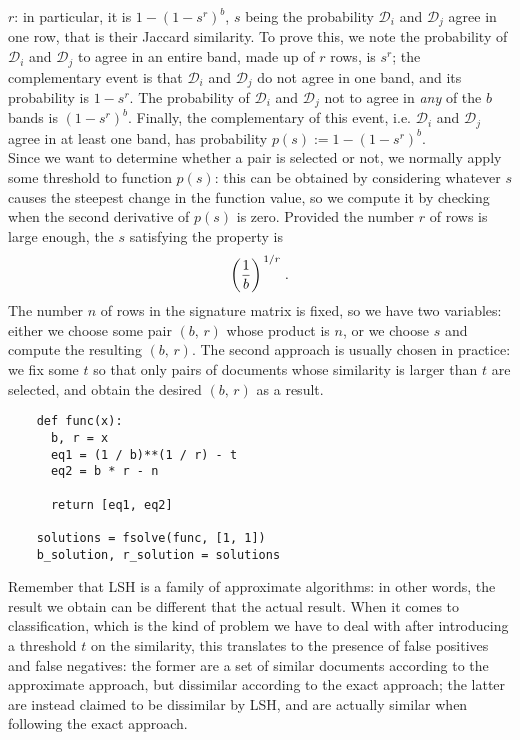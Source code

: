 \documentclass{article}
\begin{document}
  \( r \): in particular, it is \( 1 - ( 1 - s^r )^b \), \( s \) being the
  probability \( \mathcal D_i \) and \( \mathcal D_j \) agree in one row, that
  is their Jaccard similarity. To prove this, we note the probability of
  \( \mathcal D_i \) and \( \mathcal D_j \) to agree in an entire band, made up
  of \( r \) rows, is \( s^r \); the complementary event is that
  \( \mathcal D_i \) and \( \mathcal D_j \) do not agree in one band, and its
  probability is \( 1 - s^r \). The probability of \( \mathcal D_i \) and
  \( \mathcal D_j \) not to agree in \textit{any} of the \( b \) bands is
  \( ( 1 - s^r )^b \). Finally, the complementary of this event, i.e.
  \( \mathcal D_i \) and \( \mathcal D_j \) agree in at least one band, has
  probability \( p ( s ) := 1 - ( 1 - s^r )^b \). \\
  Since we want to determine whether a pair is selected or not, we normally
  apply some threshold to function \( p ( s ) \): this can be obtained by
  considering whatever \( s \) causes the steepest change in the function
  value, so we compute it by checking when the second derivative of
  \( p( s ) \) is zero. Provided the number \( r \) of rows is large enough,
  the \( s \) satisfying the property is
  \[
    \left ( \frac 1 b \right )^{ \slashfrac 1 r } \mathrm .
  \]
  The number \( n \) of rows in the signature matrix is fixed, so we have two
  variables: either we choose some pair \( ( b, \, r ) \) whose
  product is \( n \), or we choose \( s \) and compute the resulting
  \( ( b, \, r ) \). The second approach is usually chosen in practice: we fix
  some \( t \) so that only pairs of documents whose similarity is larger than
  \( t \) are selected, and obtain the desired \( ( b, \, r ) \) as a result.
  \\
  \begin{verbatim}
    def func(x):
      b, r = x
      eq1 = (1 / b)**(1 / r) - t
      eq2 = b * r - n

      return [eq1, eq2]

    solutions = fsolve(func, [1, 1])
    b_solution, r_solution = solutions
  \end{verbatim}
  Remember that LSH is a family of approximate algorithms: in other words, the
  result we obtain can be different that the actual result. When it comes to
  classification, which is the kind of problem we have to deal with after
  introducing a threshold \( t \) on the similarity, this translates to the
  presence of false positives and false negatives: the former are a set of
  similar documents according to the approximate approach, but dissimilar
  according to the exact approach; the latter are instead claimed to be
  dissimilar by LSH, and are actually similar when following the exact
  approach.
\end{document}
